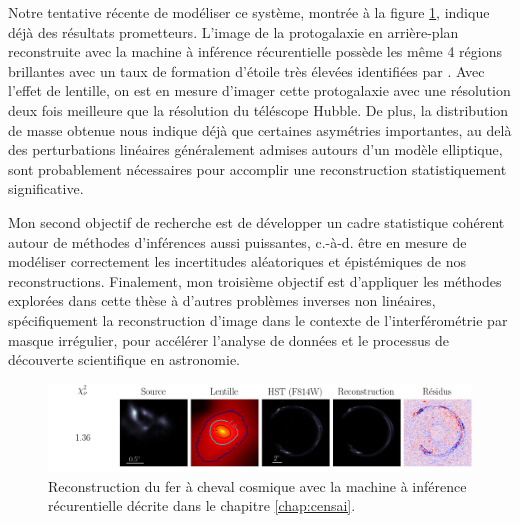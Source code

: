 Notre tentative récente de modéliser ce système, montrée à la figure \ref{fig:horseshoe}, indique  
déjà des résultats prometteurs. L'image de la protogalaxie en arrière-plan reconstruite avec la machine à inférence 
récurentielle possède les même 4 régions brillantes avec un taux de formation d'étoile très élevées identifiées par \citet{James2018}. 
Avec l'effet de lentille, on est en mesure d'imager cette protogalaxie avec une résolution deux fois meilleure que la 
résolution du téléscope Hubble. De plus, la distribution de masse obtenue nous indique déjà que certaines asymétries importantes, 
au delà des perturbations linéaires généralement admises autours d'un modèle elliptique,
sont probablement nécessaires pour accomplir une reconstruction statistiquement significative.

Mon second objectif de recherche est de développer un cadre statistique cohérent autour de méthodes 
d'inférences aussi puissantes, c.-à-d. être en mesure de modéliser correctement les incertitudes aléatoriques et épistémiques 
de nos reconstructions. Finalement, mon troisième objectif est d'appliquer les méthodes explorées dans cette thèse à d'autres problèmes 
inverses non linéaires, spécifiquement la reconstruction d'image dans le contexte de l'interférométrie par masque irrégulier, 
pour accélérer l'analyse de données et le processus de découverte scientifique en astronomie.


\begin{figure}[H]
        \centering
        \includegraphics[width=\textwidth]{figures/horseshoe_pred2}
        \caption{Reconstruction du fer à cheval cosmique avec la machine à inférence récurentielle 
        décrite dans le chapitre \ref{chap:censai}.}
        \label{fig:horseshoe}
\end{figure}

